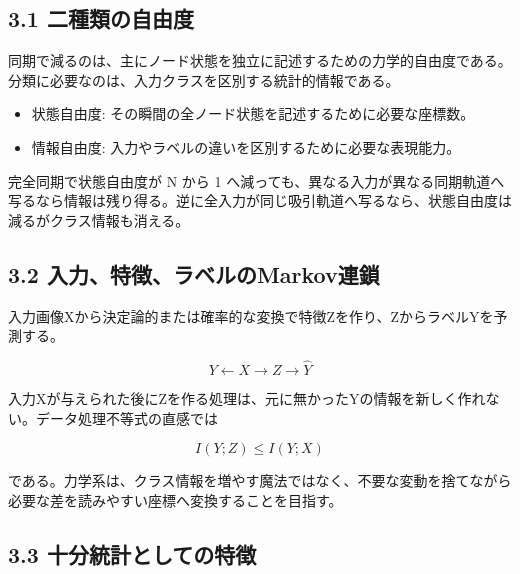 \documentclass[11pt,a4paper]{ltjsarticle}
\begin{document}

\subsection*{\textcolor{researchblue}{3.1 二種類の自由度}}

同期で減るのは、主にノード状態を独立に記述するための力学的自由度である。分類に必要なのは、入力クラスを区別する統計的情報である。\par

\begin{itemize}

\item 状態自由度: その瞬間の全ノード状態を記述するために必要な座標数。

\item 情報自由度: 入力やラベルの違いを区別するために必要な表現能力。

\end{itemize}

完全同期で状態自由度が N から 1 へ減っても、異なる入力が異なる同期軌道へ写るなら情報は残り得る。逆に全入力が同じ吸引軌道へ写るなら、状態自由度は減るがクラス情報も消える。\par

\subsection*{\textcolor{researchblue}{3.2 入力、特徴、ラベルのMarkov連鎖}}

入力画像Xから決定論的または確率的な変換で特徴Zを作り、ZからラベルYを予測する。\par

\[
Y\longleftarrow X\longrightarrow Z\longrightarrow \widehat{Y}
\]

入力Xが与えられた後にZを作る処理は、元に無かったYの情報を新しく作れない。データ処理不等式の直感では\par

\[
I(Y;Z)\le I(Y;X)
\]

である。力学系は、クラス情報を増やす魔法ではなく、不要な変動を捨てながら必要な差を読みやすい座標へ変換することを目指す。\par

\subsection*{\textcolor{researchblue}{3.3 十分統計としての特徴}}
\end{document}
